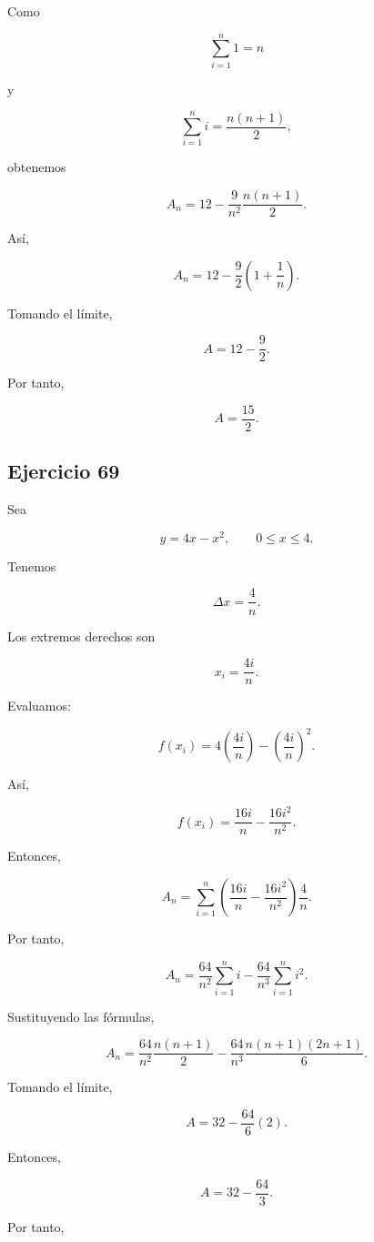 \documentclass[12pt]{article}
\begin{document}
Como

\[
\sum_{i=1}^{n}1=n
\]

y

\[
\sum_{i=1}^{n}i
=
\frac{n(n+1)}2,
\]

obtenemos

\[
A_n
=
12
-
\frac{9}{n^2}
\frac{n(n+1)}2.
\]

Así,

\[
A_n
=
12
-
\frac92
\left(
1+\frac1n
\right).
\]

Tomando el límite,

\[
A
=
12-\frac92.
\]

Por tanto,

\[
\boxed{
A=\frac{15}{2}
}.
\]

\subsection*{Ejercicio 69}

Sea

\[
y=4x-x^2,
\qquad
0\leq x\leq4.
\]

Tenemos

\[
\Delta x
=
\frac4n.
\]

Los extremos derechos son

\[
x_i
=
\frac{4i}{n}.
\]

Evaluamos:

\[
f(x_i)
=
4\left(\frac{4i}{n}\right)
-
\left(\frac{4i}{n}\right)^2.
\]

Así,

\[
f(x_i)
=
\frac{16i}{n}
-
\frac{16i^2}{n^2}.
\]

Entonces,

\[
A_n
=
\sum_{i=1}^{n}
\left(
\frac{16i}{n}
-
\frac{16i^2}{n^2}
\right)
\frac4n.
\]

Por tanto,

\[
A_n
=
\frac{64}{n^2}
\sum_{i=1}^{n}i
-
\frac{64}{n^3}
\sum_{i=1}^{n}i^2.
\]

Sustituyendo las fórmulas,

\[
A_n
=
\frac{64}{n^2}
\frac{n(n+1)}2
-
\frac{64}{n^3}
\frac{n(n+1)(2n+1)}6.
\]

Tomando el límite,

\[
A
=
32
-
\frac{64}{6}(2).
\]

Entonces,

\[
A
=
32-\frac{64}{3}.
\]

Por tanto,
\end{document}
